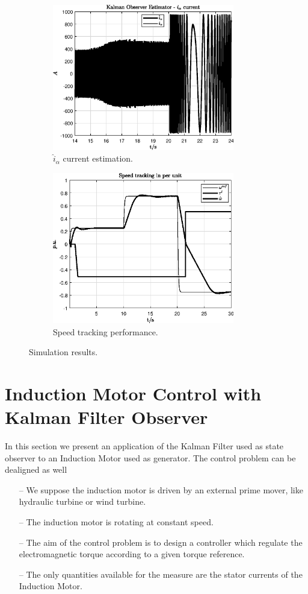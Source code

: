 \documentclass[11pt,a4paper,oneside]{book}
\numberwithin{equation}{section}
\theoremstyle{it}
\theoremstyle{definition}
\begin{document}
\begin{figure}[H]
	\centering
	\begin{subfigure}{.5\textwidth}
		\centering
		\includegraphics[width = 225pt, angle=0, 
		keepaspectratio]{figures/mpc/observerIa.eps}
		\caption{$\hat{i}_\alpha$ current estimation.}
		\label{}
	\end{subfigure}%
	\begin{subfigure}{.5\textwidth}
		\centering
		\includegraphics[width = 225pt, angle=0, 
		keepaspectratio]{figures/mpc/SpeedTracking.eps}
		\caption{Speed tracking performance.}
		\label{speed_tracking_pmsm}
	\end{subfigure}
	\caption{Simulation results.}
	\label{}
\end{figure}


\section{Induction Motor Control with Kalman Filter Observer}
In this section we present an application of the Kalman Filter used as state 
observer to an Induction Motor used as generator. The control problem can be 
dealigned as well
\begin{itemize}
	\item[--] We suppose the induction motor is driven by an external prime 
	mover, like hydraulic turbine or wind turbine.
	\item[--] The induction motor is rotating at constant speed.
	\item[--] The aim of the control problem is to design a controller which 
	regulate the electromagnetic torque according to a given torque reference.
	\item[--] The only quantities available for the measure are the stator 
	currents of the Induction Motor.
\end{itemize} 
\end{document}
